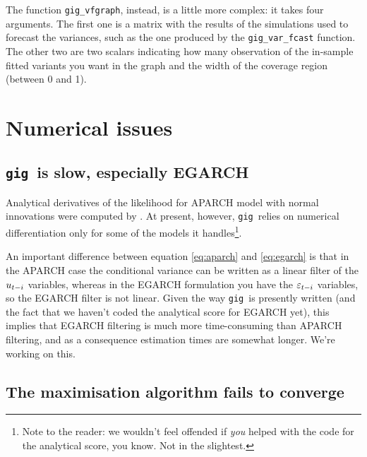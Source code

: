 \documentclass[a4paper,11pt]{article}
\newcommand{\cmd}[1]{\texttt{#1}}
\newcommand{\stdu}{\ensuremath \varepsilon}
\newcommand{\uhat}{\ensuremath u}
\newcommand{\gig}{\texttt{gig}}
\begin{document}
The function \cmd{gig\_vfgraph}, instead, is a little more complex: it
takes four arguments. The first one is a matrix with the results of
the simulations used to forecast the variances, such as the one
produced by the \cmd{gig\_var\_fcast} function. The other two are two
scalars indicating how many observation of the in-sample fitted
variants you want in the graph and the width of the coverage region
(between 0 and 1).

\section{Numerical issues}
\label{sec:numerical}

\subsection{\gig\ is slow, especially EGARCH}
Analytical derivatives of the likelihood for APARCH model with normal
innovations were computed by \cite{Laurent}. At present, however,
\gig\ relies on numerical differentiation only for some of the models
it handles\footnote{Note to the reader: we wouldn't feel offended if
  \emph{you} helped with the code for the analytical score, you
  know. Not in the slightest.}. 

An important difference between equation \eqref{eq:aparch} and
\eqref{eq:egarch} is that in the APARCH case the conditional variance
can be written as a linear filter of the $\uhat_{t-i}$ variables,
whereas in the EGARCH formulation you have the $\stdu_{t-i}$
variables, so the EGARCH filter is not linear. Given the way \gig\ is
presently written (and the fact that we haven't coded the analytical
score for EGARCH yet), this implies that EGARCH filtering is much more
time-consuming than APARCH filtering, and as a consequence estimation
times are somewhat longer. We're working on this.

\subsection{The maximisation algorithm fails to converge}
\end{document}

